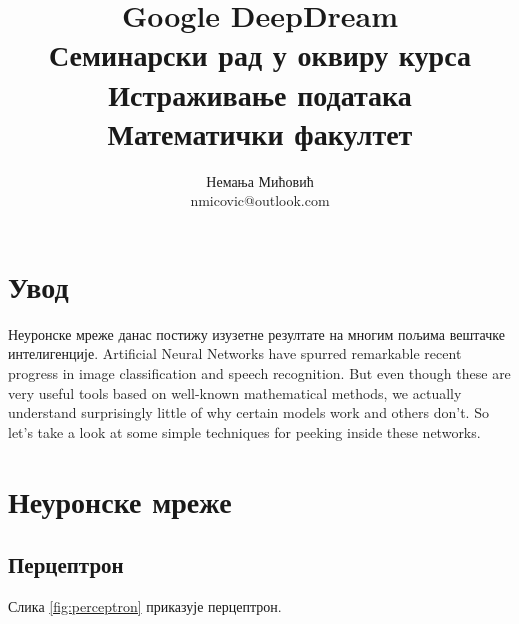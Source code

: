 \documentclass[a4paper]{article}
\begin{document}
\title{Google DeepDream \\ \small{Семинарски рад у оквиру курса\\Истраживање података\\ Математички факултет}}

\author{Немања Мићовић\\ nmicovic@outlook.com}
\date{}
\maketitle


\tableofcontents

\newpage

\section{Увод}
Неуронске мреже данас постижу изузетне резултате на многим пољима вештачке интелигенције.
Artificial Neural Networks have spurred remarkable recent progress in image classification and speech recognition.
But even though these are very useful tools based on well-known mathematical methods,
we actually understand surprisingly little of why certain models work and others don’t.
So let’s take a look at some simple techniques for peeking inside these networks.

\section{Неуронске мреже}

\subsection{Перцептрон}
Слика \ref{fig:perceptron} приказује перцептрон.
\end{document}
